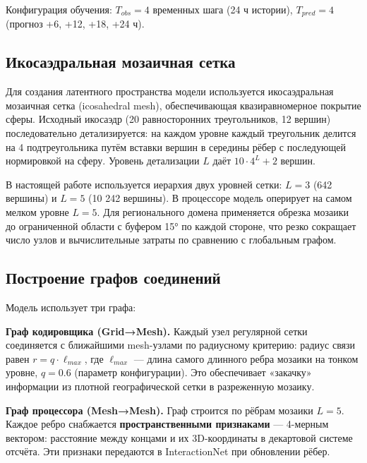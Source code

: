 \documentclass[14pt,a4paper]{extarticle}
\numberwithin{table}{section}
\numberwithin{figure}{section}
\numberwithin{equation}{section}
\begin{document}
Конфигурация обучения: \(T_{obs} = 4\) временных шага (24 ч истории),
\(T_{pred} = 4\) (прогноз +6, +12, +18, +24 ч).

\subsection{Икосаэдральная мозаичная сетка}\label{ux438ux43aux43eux441ux430ux44dux434ux440ux430ux43bux44cux43dux430ux44f-ux43cux43eux437ux430ux438ux447ux43dux430ux44f-ux441ux435ux442ux43aux430}

Для создания латентного пространства модели используется икосаэдральная
мозаичная сетка (icosahedral mesh), обеспечивающая квазиравномерное
покрытие сферы. Исходный икосаэдр (20 равносторонних треугольников, 12
вершин) последовательно детализируется: на каждом уровне каждый
треугольник делится на 4 подтреугольника путём вставки вершин в середины
рёбер с последующей нормировкой на сферу. Уровень детализации \(L\)
даёт \(10 \cdot 4^L + 2\) вершин.

В настоящей работе используется иерархия двух уровней сетки: \(L = 3\)
(642 вершины) и \(L = 5\) (10 242 вершины). В процессоре модель
оперирует на самом мелком уровне \(L = 5\). Для регионального домена
применяется обрезка мозаики до ограниченной области с буфером
15° по каждой стороне, что резко сокращает число узлов и вычислительные
затраты по сравнению с глобальным графом.

\subsection{Построение графов соединений}\label{ux43fux43eux441ux442ux440ux43eux435ux43dux438ux435-ux433ux440ux430ux444ux43eux432-ux441ux43eux435ux434ux438ux43dux435ux43dux438ux439}

Модель использует три графа:

\textbf{Граф кодировщика (Grid→Mesh).} Каждый узел регулярной сетки
соединяется с ближайшими mesh-узлами по радиусному критерию: радиус
связи равен \(r = q \cdot \ell_{max}\), где \(\ell_{max}\) --- длина
самого длинного ребра мозаики на тонком уровне, \(q = 0.6\) (параметр
конфигурации). Это обеспечивает «закачку» информации из плотной
географической сетки в разреженную мозаику.

\textbf{Граф процессора (Mesh→Mesh).} Граф строится по рёбрам мозаики
\(L = 5\). Каждое ребро снабжается \textbf{пространственными признаками}
--- 4-мерным вектором: расстояние между концами и их 3D-координаты в
декартовой системе отсчёта. Эти признаки передаются в InteractionNet при
обновлении рёбер.
\end{document}
